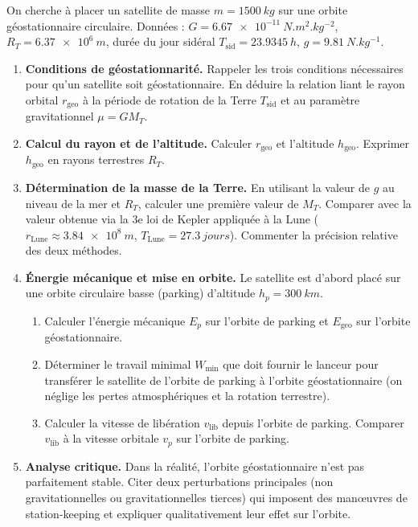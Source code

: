 \documentclass[11pt]{article}
\begin{document}
\begin{exercice}
On cherche à placer un satellite de masse $m = \SI{1500}{kg}$ sur une orbite géostationnaire circulaire. Données : $G = \SI{6.67e-11}{N.m^2.kg^{-2}}$, $R_T = \SI{6.37e6}{m}$, durée du jour sidéral $T_{\text{sid}} = \SI{23.9345}{h}$, $g = \SI{9.81}{N.kg^{-1}}$.
\begin{enumerate}
    \item \textbf{Conditions de géostationnarité.} Rappeler les trois conditions nécessaires pour qu'un satellite soit géostationnaire. En déduire la relation liant le rayon orbital $r_{\text{geo}}$ à la période de rotation de la Terre $T_{\text{sid}}$ et au paramètre gravitationnel $\mu = GM_T$.
    \item \textbf{Calcul du rayon et de l'altitude.} Calculer $r_{\text{geo}}$ et l'altitude $h_{\text{geo}}$. Exprimer $h_{\text{geo}}$ en rayons terrestres $R_T$.
    \item \textbf{Détermination de la masse de la Terre.} En utilisant la valeur de $g$ au niveau de la mer et $R_T$, calculer une première valeur de $M_T$. Comparer avec la valeur obtenue via la 3e loi de Kepler appliquée à la Lune ($r_{\text{Lune}} \approx \SI{3.84e8}{m}$, $T_{\text{Lune}} = \SI{27.3}{jours}$). Commenter la précision relative des deux méthodes.
    \item \textbf{Énergie mécanique et mise en orbite.} Le satellite est d'abord placé sur une orbite circulaire basse (parking) d'altitude $h_p = \SI{300}{km}$.
    \begin{enumerate}
        \item Calculer l'énergie mécanique $E_p$ sur l'orbite de parking et $E_{\text{geo}}$ sur l'orbite géostationnaire.
        \item Déterminer le travail minimal $W_{\text{min}}$ que doit fournir le lanceur pour transférer le satellite de l'orbite de parking à l'orbite géostationnaire (on néglige les pertes atmosphériques et la rotation terrestre).
        \item Calculer la vitesse de libération $v_{\text{lib}}$ depuis l'orbite de parking. Comparer $v_{\text{lib}}$ à la vitesse orbitale $v_p$ sur l'orbite de parking.
    \end{enumerate}
    \item \textbf{Analyse critique.} Dans la réalité, l'orbite géostationnaire n'est pas parfaitement stable. Citer deux perturbations principales (non gravitationnelles ou gravitationnelles tierces) qui imposent des manœuvres de station-keeping et expliquer qualitativement leur effet sur l'orbite.
\end{enumerate}
\end{exercice}
\end{document}
